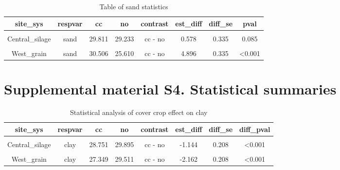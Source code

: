 \documentclass[
]{article}
\begin{document}
\begin{table}[H]

\caption{\label{tab:texture2}Table of sand statistics}
\centering
\begin{tabular}[t]{cccccccc}
\toprule
site\_sys & respvar & cc & no & contrast & est\_diff & diff\_se & pval\\
\midrule
\cellcolor{gray!6}{Central\_grain} & \cellcolor{gray!6}{sand} & \cellcolor{gray!6}{32.486} & \cellcolor{gray!6}{31.600} & \cellcolor{gray!6}{cc - no} & \cellcolor{gray!6}{0.886} & \cellcolor{gray!6}{0.299} & \cellcolor{gray!6}{0.003}\\
Central\_silage & sand & 29.811 & 29.233 & cc - no & 0.578 & 0.335 & 0.085\\
\cellcolor{gray!6}{East\_grain} & \cellcolor{gray!6}{sand} & \cellcolor{gray!6}{12.715} & \cellcolor{gray!6}{9.837} & \cellcolor{gray!6}{cc - no} & \cellcolor{gray!6}{2.877} & \cellcolor{gray!6}{0.335} & \cellcolor{gray!6}{<0.001}\\
West\_grain & sand & 30.506 & 25.610 & cc - no & 4.896 & 0.335 & <0.001\\
\bottomrule
\end{tabular}
\end{table}

\hypertarget{supplemental-material-s4.-statistical-summaries}{%
\section{Supplemental material S4. Statistical
summaries}\label{supplemental-material-s4.-statistical-summaries}}

\begin{table}[H]

\caption{\label{tab:clay}Statistical analysis of cover crop effect on clay}
\centering
\begin{tabular}[t]{cccccccc}
\toprule
site\_sys & respvar & cc & no & contrast & est\_diff & diff\_se & diff\_pval\\
\midrule
\cellcolor{gray!6}{Central\_grain} & \cellcolor{gray!6}{clay} & \cellcolor{gray!6}{27.740} & \cellcolor{gray!6}{28.000} & \cellcolor{gray!6}{cc - no} & \cellcolor{gray!6}{-0.260} & \cellcolor{gray!6}{0.186} & \cellcolor{gray!6}{0.164}\\
Central\_silage & clay & 28.751 & 29.895 & cc - no & -1.144 & 0.208 & <0.001\\
\cellcolor{gray!6}{East\_grain} & \cellcolor{gray!6}{clay} & \cellcolor{gray!6}{31.730} & \cellcolor{gray!6}{34.606} & \cellcolor{gray!6}{cc - no} & \cellcolor{gray!6}{-2.876} & \cellcolor{gray!6}{0.208} & \cellcolor{gray!6}{<0.001}\\
West\_grain & clay & 27.349 & 29.511 & cc - no & -2.162 & 0.208 & <0.001\\
\bottomrule
\end{tabular}
\end{table}
\end{document}
